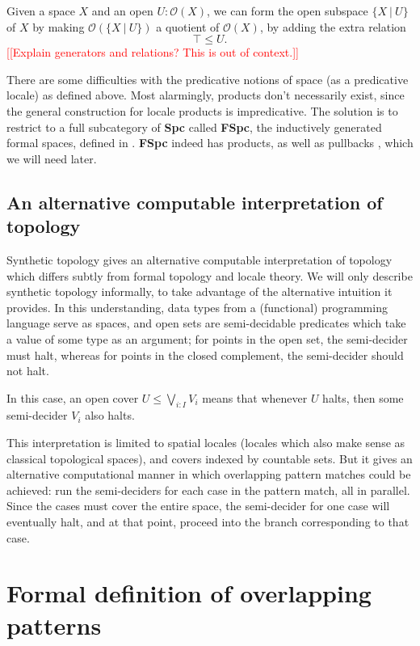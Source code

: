 \documentclass[conference]{IEEEtran}
\newcommand{\suchthat}{\ |\ }
\newcommand{\Open}[1]{\mathcal{O}({#1})}
\newcommand{\note}[1]{\textcolor{red}{[[{#1}]]}}
\begin{document}
Given a space $X$ and an open $U : \Open{X}$, we can form the open subspace $\{ X \suchthat U \}$ of $X$ by making $\Open{\{X \suchthat U \}}$ a quotient of $\Open{X}$, by adding the extra relation
\[
\top \le U.
\]
\note{Explain generators and relations? This is out of context.}

There are some difficulties with the predicative notions of space (as a predicative locale) as defined above. Most alarmingly, products don't necessarily exist, since the general construction for locale products is impredicative. The solution is to restrict to a full subcategory of \textbf{Spc} called \textbf{FSpc}, the inductively generated formal spaces, defined in \cite{coquand2003}. \textbf{FSpc} indeed has products, as well as pullbacks \cite{palmgren2003}, which we will need later.

\subsection{An alternative computable interpretation of topology}

Synthetic topology \cite{escardo2004, lesnik} gives an alternative computable interpretation of topology which differs subtly from formal topology and locale theory. We will only describe synthetic topology informally, to take advantage of the alternative intuition it provides. In this understanding, data types from a (functional) programming language serve as spaces, and open sets are semi-decidable predicates which take a value of some type as an argument; for points in the open set, the semi-decider must halt, whereas for points in the closed complement, the semi-decider should not halt.

In this case, an open cover $U \le \bigvee_{i : I} V_i$ means that whenever $U$ halts, then some semi-decider $V_i$ also halts.

This interpretation is limited to spatial locales (locales which also make sense as classical topological spaces), and covers indexed by countable sets. But it gives an alternative computational manner in which overlapping pattern matches could be achieved: run the semi-deciders for each case in the pattern match, all in parallel. Since the cases must cover the entire space, the semi-decider for one case will eventually halt, and at that point, proceed into the branch corresponding to that case.

\section{Formal definition of overlapping patterns}
\end{document}
